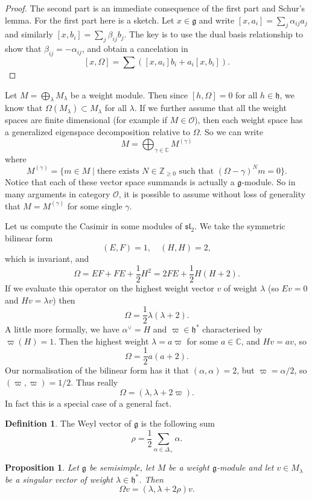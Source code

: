 \documentclass[12pt]{article}
\theoremstyle{plain}
\newtheorem{prop}[thm]{Proposition}
\theoremstyle{definition}
\newtheorem{defn}{Definition}[section]
\numberwithin{equation}{section}
\newcommand{\al}{\alpha}
\newcommand{\la}{\lambda}
\newcommand{\Om}{\Omega}
\newcommand{\D}{\Delta}
\newcommand{\C}{\mathbb{C}}
\newcommand{\Z}{\mathbb{Z}}
\newcommand{\g}{\mathfrak{g}}
\newcommand{\h}{\mathfrak{h}}
\newcommand{\sll}{\mathfrak{sl}}
\newcommand{\OO}{\mathcal{O}}
\begin{document}
\begin{proof}
The second part is an immediate consequence of the first part and Schur's lemma. For the first part here is a sketch. Let $x \in \g$ and write $[x, a_i] = \sum_j \alpha_{ij} a_j$ and similarly $[x, b_i] = \sum_j \beta_{ij} b_j$. The key is to use the dual basis relationship to show that $\beta_{ij} = -\al_{ij}$, and obtain a cancelation in
\[
[x, \Om] = \sum([x, a_i]b_i + a_i [x, b_i]).
\]
\end{proof}
Let $M = \bigoplus_{\la} M_\la$ be a weight module. Then since $[h, \Om] = 0$ for all $h \in \h$, we know that $\Om(M_\la) \subset M_{\la}$ for all $\la$. If we further assume that all the weight spaces are finite dimensional (for example if $M \in \OO$), then each weight space has a generalized eigenspace decomposition relative to $\Om$. So we can write
\[
M = \bigoplus_{\gamma \in \C} M^{(\gamma)}
\]
where
\[
M^{(\gamma)} = \{m \in M \mid \text{there exists $N \in \Z_{\geq 0}$ such that $(\Om-\gamma)^N m = 0$}\}.
\]
Notice that each of these vector space summands is actually a $\g$-module. So in many arguments in category $\OO$, it is possible to assume without loss of generality that $M = M^{(\gamma)}$ for some single $\gamma$.



Let us compute the Casimir in some modules of $\sll_2$. We take the symmetric bilinear form
\[
(E, F) = 1, \quad (H, H) = 2,
\]
which is invariant, and
\[
\Omega = EF + FE + \frac{1}{2} H^2 = 2FE + \frac{1}{2}H(H+2).
\]
If we evaluate this operator on the highest weight vector $v$ of weight $\lambda$ (so $Ev = 0$ and $Hv = \lambda v$) then
\[
\Omega = \frac{1}{2}\lambda(\lambda+2).
\]
A little more formally, we have $\al^\vee = H$ and $\varpi \in \h^*$ characterised by $\varpi(H) = 1$. Then the highest weight $\la = a \varpi$ for some $a \in \C$, and $H v = a v$, so
\[
\Omega = \frac{1}{2}a(a+2).
\]
Our normalisation of the bilinear form has it that $(\al, \al) = 2$, but $\varpi = \al / 2$, so $(\varpi, \varpi) = 1/2$. Thus really
\[
\Omega = (\la, \la + 2\varpi).
\]
In fact this is a special case of a general fact.
\begin{defn}
The Weyl vector of $\g$ is the following sum
\[
\rho = \frac{1}{2} \sum_{\al \in \D_+} \al.
\]
\end{defn}
\begin{prop}
Let $\g$ be semisimple, let $M$ be a weight $\g$-module and let $v \in M_\la$ be a singular vector of weight $\la \in \h^*$. Then
\[
\Om v = (\la, \la+2\rho) v.
\]
\end{prop}
\end{document}
